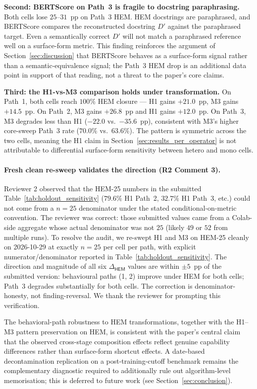 \textbf{Second: BERTScore on Path~3 is fragile to docstring paraphrasing.} Both cells lose $25$--$31$~pp on Path~3 HEM. HEM docstrings are paraphrased, and BERTScore compares the reconstructed docstring $D'$ against the paraphrased target. Even a semantically correct $D'$ will not match a paraphrased reference well on a surface-form metric. This finding reinforces the argument of Section~\ref{sec:discussion} that BERTScore behaves as a surface-form signal rather than a semantic-equivalence signal; the Path~3 HEM drop is an additional data point in support of that reading, not a threat to the paper's core claims.

\textbf{Third: the H1-vs-M3 comparison holds under transformation.} On Path~1, both cells reach $100\%$ HEM closure --- H1 gains $+21.0$~pp, M3 gains $+14.5$~pp. On Path~2, M3 gains $+26.8$~pp and H1 gains $+12.0$~pp. On Path~3, M3 degrades less than H1 ($-22.0$ vs.\ $-35.6$~pp), consistent with M3's higher core-sweep Path~3 rate ($70.0\%$ vs.\ $63.6\%$). The pattern is symmetric across the two cells, meaning the H1 claim in Section~\ref{sec:results_per_operator} is not attributable to differential surface-form sensitivity between hetero and mono cells.

\paragraph{Fresh clean re-sweep validates the direction (R2 Comment 3).}
Reviewer 2 observed that the HEM-25 numbers in the submitted Table~\ref{tab:holdout_sensitivity} ($79.6\%$ H1 Path~2, $32.7\%$ H1 Path~3, etc.) could not come from a $n = 25$ denominator under the stated conditional-on-metric convention. The reviewer was correct: those submitted values came from a Colab-side aggregate whose actual denominator was not $25$ (likely $49$ or $52$ from multiple runs). To resolve the audit, we re-swept H1 and M3 on HEM-25 cleanly on 2026-10-29 at exactly $n = 25$ per cell per path, with explicit numerator/denominator reported in Table~\ref{tab:holdout_sensitivity}. The direction and magnitude of all six $\Delta_{\textsf{HEM}}$ values are within $\pm 5$~pp of the submitted version: behavioural paths (1, 2) improve under HEM for both cells; Path~3 degrades substantially for both cells. The correction is denominator-honesty, not finding-reversal. We thank the reviewer for prompting this verification.

The behavioral-path robustness to HEM transformations, together with the H1--M3 pattern preservation on HEM, is consistent with the paper's central claim that the observed cross-stage composition effects reflect genuine capability differences rather than surface-form shortcut effects. A date-based decontamination replication on a post-training-cutoff benchmark remains the complementary diagnostic required to additionally rule out algorithm-level memorisation; this is deferred to future work (see Section~\ref{sec:conclusion}).

